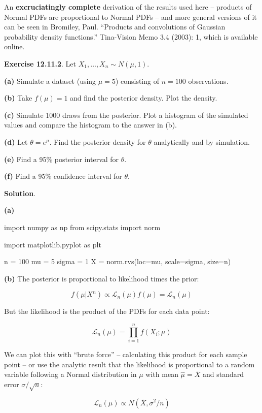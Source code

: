 An \textbf{excruciatingly complete} derivation of the results used here
-- products of Normal PDFs are proportional to Normal PDFs -- and more
general versions of it can be seen in Bromiley, Paul. ``Products and
convolutions of Gaussian probability density functions.'' Tina-Vision
Memo 3.4 (2003): 1, which is available online.

\textbf{Exercise 12.11.2}. Let \(X_{1}, \dots, X_{n} \sim N(\mu, 1)\).

\textbf{(a)} Simulate a dataset (using \(\mu = 5\)) consisting of
\(n = 100\) observations.

\textbf{(b)} Take \(f(\mu) = 1\) and find the posterior density. Plot
the density.

\textbf{(c)} Simulate 1000 draws from the posterior. Plot a histogram of
the simulated values and compare the histogram to the answer in (b).

\textbf{(d)} Let \(\theta = e^\mu\). Find the posterior density for
\(\theta\) analytically and by simulation.

\textbf{(e)} Find a 95\% posterior interval for \(\theta\).

\textbf{(f)} Find a 95\% confidence interval for \(\theta\).

\textbf{Solution}.

\textbf{(a)}

\begin{python}
import numpy as np
from scipy.stats import norm

import matplotlib.pyplot as plt

n = 100
mu = 5
sigma = 1
X = norm.rvs(loc=mu, scale=sigma, size=n)
\end{python}

\textbf{(b)} The posterior is proportional to likelihood times the
prior:

\[f(\mu | X^{n}) \propto \mathcal{L}_{n}(\mu) f(\mu) = \mathcal{L}_{n}(\mu)\]

But the likelihood is the product of the PDFs for each data point:

\[\mathcal{L}_{n}(\mu) = \prod_{i=1}^{n} f(X_{i}; \mu)\]

We can plot this with ``brute force'' -- calculating this product for
each sample point -- or use the analytic result that the likelihood is
proportional to a random variable following a Normal distribution in
\(\mu\) with mean \(\hat{\mu} = \overline{X}\) and standard error
\(\sigma / \sqrt{n}\):

\[\mathcal{L}_{n}(\mu) \propto N(\overline{X}, \sigma^{2} / n)\]

